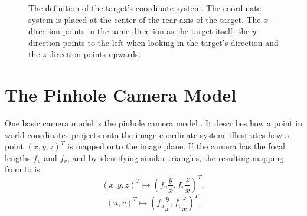 \begin{figure}[!ht]
    \centering
    \hspace*{2cm}
    \caption{\label{fig:targetcoordsystem} The definition of the target's coordinate system. The coordinate system is placed at the center of the rear axis of the target. The $x$-direction points in the same direction as the target itself, the $y$-direction  points to the left when looking in the target's direction and the $z$-direction points upwards.}
\end{figure}

\section{The Pinhole Camera Model}
One basic camera model is the pinhole camera model \cite{Hartley:2004}.
It describes how a point in world coordinates projects onto the image coordinate system.
 illustrates how a point $(x, y, z)^T$ is mapped onto the image plane.
If the camera has the focal lengths $f_u$ and $f_v$, and by identifying similar triangles, the resulting mapping from  to  is
\begin{equation*}
    (x, y, z)^T \mapsto \left(f_u\frac{y}{x}, f_v\frac{z}{x}\right)^T,
\end{equation*}
\ie
\begin{equation*}
    (u, v)^T \mapsto \left(f_u\frac{y}{x}, f_v\frac{z}{x}\right)^T.
\end{equation*}

